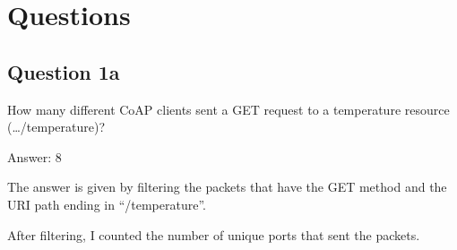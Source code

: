 \documentclass[11pt]{article}
\begin{document}
    \hypertarget{questions}{%
\section{Questions}\label{questions}}

    \hypertarget{question-1a}{%
\subsection{Question 1a}\label{question-1a}}

How many different CoAP clients sent a GET request to a temperature
resource (\ldots/temperature)?

Answer: 8

The answer is given by filtering the packets that have the GET method
and the URI path ending in ``/temperature''.

After filtering, I counted the number of unique ports that sent the
packets.
\end{document}
